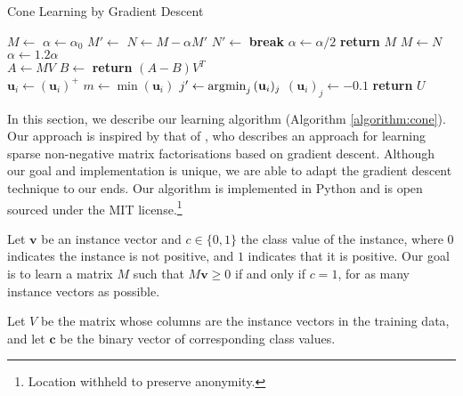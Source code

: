 \begin{algorithm}
\caption{Cone Learning by Gradient Descent}\label{algorithm:cone}
\begin{algorithmic}
  \State $M \gets$ 
  \State $\alpha \gets \alpha_0$
  \Loop
    \State $M' \gets$ 
    \Loop
      \State $N \gets M - \alpha M'$
      \State $N' \gets$ 
        \State \textbf{break}
      \EndIf
      \State $\alpha \gets \alpha/2$
        \State \textbf{return} $M$
      \EndIf
    \EndLoop
    \State $M \gets N$
    \State $\alpha \gets 1.2\alpha$
  \EndLoop
  \EndProcedure
  \\
  \State $A \gets MV$
  \State $B \gets$ 
  \State \textbf{return} $(A - B)V^T$
  \EndProcedure
  \\
      \State $\mathbf{u}_i \gets (\mathbf{u}_i)^+$
    \Else
      \State $m \gets \min(\mathbf{u}_i)$
        \State $j' \gets \operatorname*{\arg\!\min}_j{(\mathbf{u}_i)_j}$
        \State $(\mathbf{u}_i)_j \gets -0.1$
      \EndIf
    \EndIf
  \EndFor
  \State \textbf{return} $U$
  \EndProcedure
\end{algorithmic}
\end{algorithm}

In this section, we describe our learning algorithm (Algorithm
\ref{algorithm:cone}). Our approach is inspired by that of
, who describes an approach for learning sparse
non-negative matrix factorisations based on gradient descent. Although
our goal and implementation is unique, we are able to adapt the
gradient descent technique to our ends. Our algorithm is implemented
in Python and is open sourced under the MIT license.\footnote{Location
  withheld to preserve anonymity.}

Let $\mathbf{v}$ be an instance vector and $c \in \{0,1\}$ the class value of
the instance, where $0$ indicates the instance is not positive, and $1$
indicates that it is positive. Our goal is to learn a matrix $M$ such
that $M\mathbf{v} \ge 0$ if and only if $c = 1$, for as many instance vectors
as possible.

Let $V$ be the matrix whose columns are the instance vectors in the
training data, and let $\mathbf{c}$ be the binary vector of
corresponding class values.

